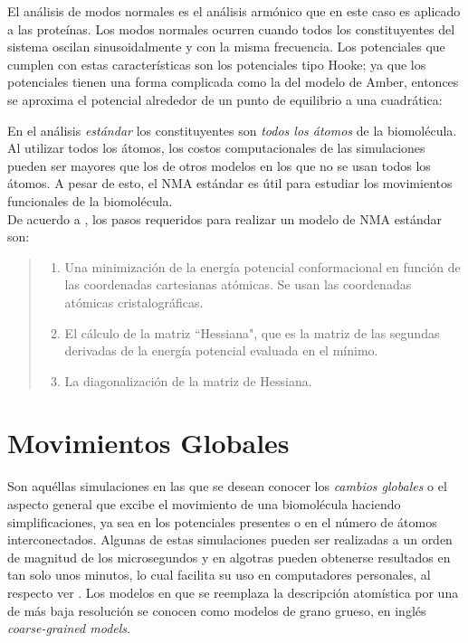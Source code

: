 El an\'{a}lisis de modos normales es el an\'{a}lisis arm\'{o}nico que en este caso es aplicado a las prote\'{i}nas. Los modos normales ocurren cuando todos los constituyentes del sistema oscilan sinusoidalmente y con la misma frecuencia. Los potenciales que cumplen con estas caracter\'{i}sticas son los potenciales tipo Hooke; ya que los potenciales tienen una forma complicada como la del modelo de Amber, entonces se aproxima el potencial alrededor de un punto de equilibrio a una cuadr\'{a}tica:

En el an\'{a}lisis \textit{est\'{a}ndar} los constituyentes son \textit{todos los \'{a}tomos} de la biomol\'{e}cula. Al utilizar todos los \'{a}tomos, los costos computacionales de las simulaciones pueden ser mayores que los de otros modelos en los que no se usan todos los \'{a}tomos. A pesar de esto, el NMA est\'{a}ndar es \'{u}til para estudiar los movimientos funcionales de la biomol\'{e}cula.\\

De acuerdo a \cite{Hayward2008}, los pasos requeridos para realizar un modelo de NMA est\'{a}ndar son:
\begin{quote}
 \begin{enumerate}
  \item Una minimizaci\'{o}n de la energ\'{i}a potencial conformacional en funci\'{o}n de las coordenadas cartesianas at\'{o}micas. Se usan las coordenadas at\'{o}micas cristalogr\'{a}ficas.
  \item El c\'{a}lculo de la matriz ``Hessiana", que es la matriz de las segundas derivadas de la energ\'{i}a potencial evaluada en el m\'{i}nimo. 
  \item La diagonalizaci\'{o}n de la matriz de Hessiana.
 \end{enumerate}
\end{quote}


\section{Movimientos Globales}

Son aqu\'{e}llas simulaciones en las que se desean conocer los \textit{cambios globales} o el aspecto general que excibe el movimiento de una biomol\'{e}cula haciendo simplificaciones, ya sea en los potenciales presentes o en el n\'{u}mero de \'{a}tomos interconectados. Algunas de estas simulaciones pueden ser realizadas a un orden de magnitud de los microsegundos y en algotras pueden obtenerse resultados en tan solo unos minutos, lo cual facilita su uso en computadores personales, al respecto ver \cite{Gur2013}. Los modelos en que se reemplaza la descripci\'{o}n atom\'{i}stica por una de m\'{a}s baja resoluci\'{o}n se conocen como modelos de grano grueso, en ingl\'{e}s \textit{coarse-grained models}.\\

